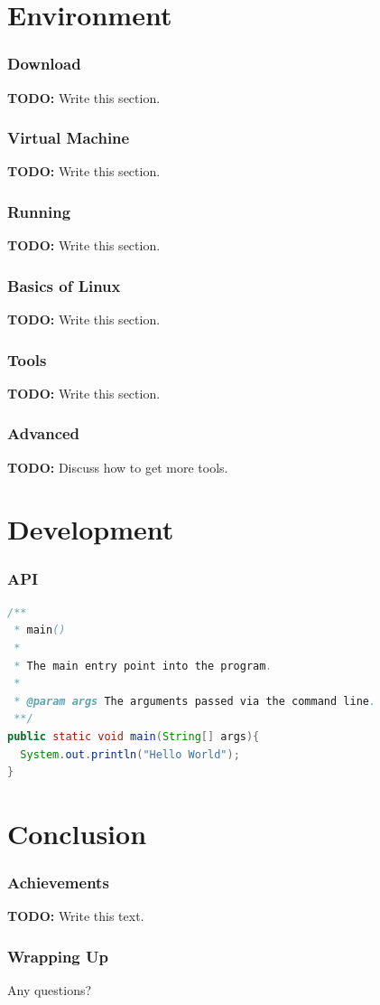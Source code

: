 \documentclass[10pt]{beamer}
\begin{document}
  \section[Env]{Environment}
  \begin{frame}
    \frametitle{Download}
    \textbf{TODO:} Write this section.
  \end{frame}
  \begin{frame}
    \frametitle{Virtual Machine}
    \textbf{TODO:} Write this section.
  \end{frame}
  \begin{frame}
    \frametitle{Running}
    \textbf{TODO:} Write this section.
  \end{frame}
  \begin{frame}
    \frametitle{Basics of Linux}
    \textbf{TODO:} Write this section.
  \end{frame}
  \begin{frame}
    \frametitle{Tools}
    \textbf{TODO:} Write this section.
  \end{frame}
  \begin{frame}
    \frametitle{Advanced}
    \textbf{TODO:} Discuss how to get more tools.
  \end{frame}
  \section[Dev]{Development}
  \begin{frame}[fragile=singleslide]
    \frametitle{API}
    \begin{lstlisting}[caption=Java Hello World,language=Java]
/**
 * main()
 *
 * The main entry point into the program.
 *
 * @param args The arguments passed via the command line.
 **/
public static void main(String[] args){
  System.out.println("Hello World");
}
    \end{lstlisting}
  \end{frame}
  \section[End]{Conclusion}
  \begin{frame}
    \frametitle{Achievements}
    \textbf{TODO:} Write this text.
  \end{frame}
  \begin{frame}
    \frametitle{Wrapping Up}
    \begin{block}{}
      \centering
      Any questions?
    \end{block}
  \end{frame}
\end{document}
